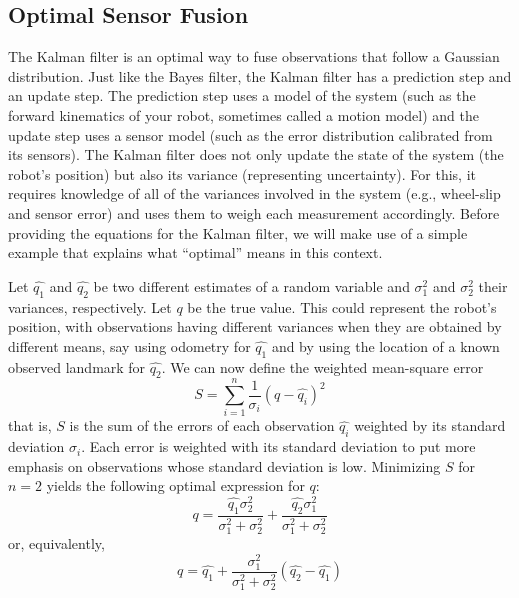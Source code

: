 

\subsection{Optimal Sensor Fusion}
The Kalman filter is an optimal way to fuse observations that follow a Gaussian distribution. Just like the Bayes filter, the Kalman filter has a prediction step and an update step. The prediction step uses a  model of the system (such as the forward kinematics of your robot, sometimes called a motion model) and the update step uses a sensor model (such as the error distribution calibrated from its sensors). The Kalman filter does not only update the state of the system (the robot's position) but also its variance (representing uncertainty). For this, it requires knowledge of all of the variances involved in the system (e.g., wheel-slip and sensor error) and uses them to weigh each measurement accordingly. Before providing the equations for the Kalman filter, we will make use of a simple example that explains what ``optimal'' means in this context.

 Let $ \hat{q_1}$ and $ \hat{q_2}$ be two different estimates of a random variable and $ \sigma^2_1$ and $ \sigma^2_2$ their variances, respectively. Let $ q$ be the true value. This could represent the robot's position, with observations having different variances when they are obtained by different means, say using odometry for $ \hat{q_1}$ and by using the location of a known observed landmark for $ \hat{q_2}$. We can now define the weighted mean-square error
 \begin{equation}
S=\displaystyle\sum_{i=1}^{n}\frac{1}{\sigma_i} (q-\hat{q_i})^2
\end{equation}
that is, $ S$ is the sum of the errors of each observation $ \hat{q_i}$ weighted by its standard deviation $ \sigma_i$. Each error is weighted  with its standard deviation to put more emphasis on observations whose standard deviation is low. Minimizing  $S$ for $n=2$ yields the following optimal expression for $q$:
\begin{equation}
q=\frac{\hat{q_1}\sigma_2^2}{\sigma_1^2+\sigma_2^2}+\frac{\hat{q_2}\sigma_1^2}{\sigma_1^2+\sigma_2^2}
\end{equation}
or, equivalently,
\begin{equation}
q=\hat{q_1}+\frac{\sigma_1^2}{\sigma_1^2+\sigma_2^2}(\hat{q_2}-\hat{q_1})\label{eq:optimalfusion}
\end{equation}

